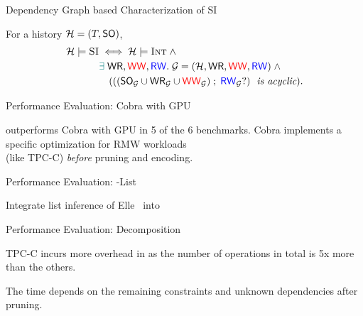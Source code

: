 \begin{frame}{Dependency Graph based Characterization of SI}
  \begin{theorem}
		For a history \emph{$\mathcal{H} = (T, \textup{\textsf{SO}})$},
		\vspace{-0.30cm}
		\begin{align*}
			\mathcal{H} \models \textsc{SI} & \iff \mathcal{H} \models \textsc{Int} \;\land \\
				&\textcolor{teal}{\exists}\; \textup{\textsf{WR}}, \textcolor{red}{\textup{\textsf{WW}}}, \textcolor{blue}{\textup{\textsf{RW}}}.\; \mathcal{G} = (\mathcal{H}, \textup{\textsf{WR}}, \textcolor{red}{\textup{\textsf{WW}}}, \textcolor{blue}{\textup{\textsf{RW}}}) \;\land \\
				&\quad ({((\textup{\textsf{SO}}_{\mathcal{G}} \cup \textup{\textsf{WR}}_{\mathcal{G}} \cup \textcolor{red}{\textup{\textsf{WW}}}_{\mathcal{G}}) \;;\; \textcolor{blue}{\textup{\textsf{RW}}}_{\mathcal{G}}?)} \text{\it\; is acyclic}).
		\end{align*}
  \end{theorem}
\end{frame}

\begin{frame}{Performance Evaluation: Cobra with GPU}
	\begin{center}
		\polysi{} outperforms Cobra with GPU in 5 of the 6 benchmarks.
		Cobra implements a specific optimization for RMW workloads \\
		(like TPC-C) {\it before} pruning and encoding.
	\end{center}
\end{frame}

\begin{frame}{Performance Evaluation: \polysi-{List}}
	\begin{center}
		Integrate list inference of Elle~ into \polysi{}
	\end{center}
\end{frame}

\begin{frame}{Performance Evaluation: Decomposition}
	\begin{center}
		TPC-C incurs more overhead in 
		as the number of operations in total is 5x more than the others.

		\vspace{0.30cm}
		\vspace{0.20cm}

		The  time depends on the remaining constraints
		and unknown dependencies {after pruning}.
	\end{center}
\end{frame}
